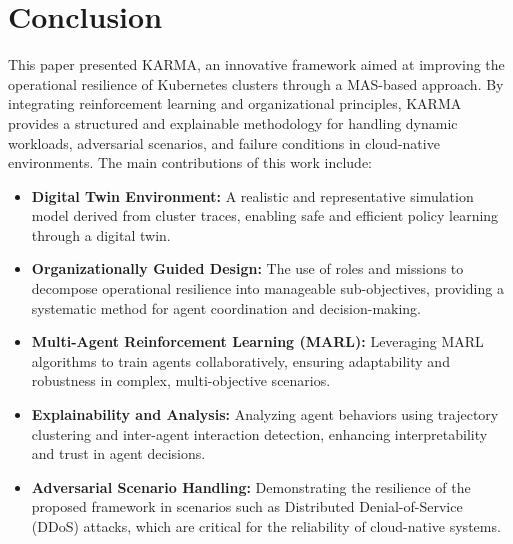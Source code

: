 \documentclass[conference]{IEEEtran}
\begin{document}
\section{Conclusion}
\label{sec:conclusion}

This paper presented KARMA, an innovative framework aimed at improving the operational resilience of Kubernetes clusters through a MAS-based approach. By integrating reinforcement learning and organizational principles, KARMA provides a structured and explainable methodology for handling dynamic workloads, adversarial scenarios, and failure conditions in cloud-native environments. The main contributions of this work include:
\begin{itemize}
    \item \textbf{Digital Twin Environment:} A realistic and representative simulation model derived from cluster traces, enabling safe and efficient policy learning through a digital twin.
    \item \textbf{Organizationally Guided Design:} The use of roles and missions to decompose operational resilience into manageable sub-objectives, providing a systematic method for agent coordination and decision-making.
    \item \textbf{Multi-Agent Reinforcement Learning (MARL):} Leveraging MARL algorithms to train agents collaboratively, ensuring adaptability and robustness in complex, multi-objective scenarios.
    \item \textbf{Explainability and Analysis:} Analyzing agent behaviors using trajectory clustering and inter-agent interaction detection, enhancing interpretability and trust in agent decisions.
    \item \textbf{Adversarial Scenario Handling:} Demonstrating the resilience of the proposed framework in scenarios such as Distributed Denial-of-Service (DDoS) attacks, which are critical for the reliability of cloud-native systems.
\end{itemize}

\
\end{document}
